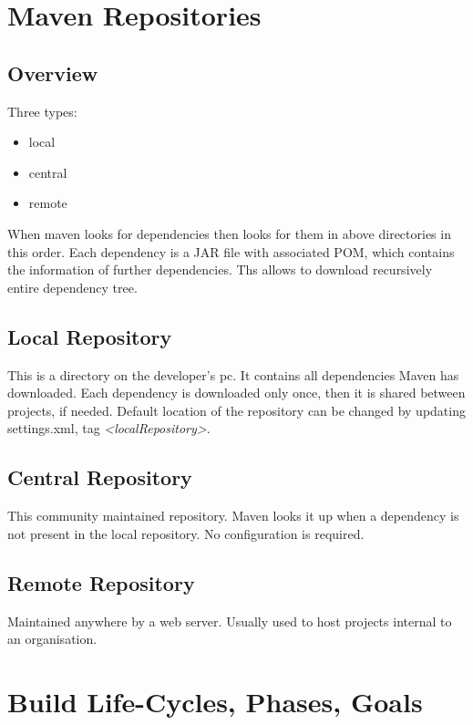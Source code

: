 \documentclass{report}
\begin{document}
\part{Maven Repositories}



\chapter{Overview}
Three types:
\begin{itemize}
	\item local
	\item central
	\item remote
\end{itemize}
When maven looks for dependencies then looks for them in above directories in this order. Each dependency is a JAR file with associated POM, which contains 
the information of further dependencies. Ths allows to download recursively entire dependency tree.

\chapter{Local Repository}
This is a directory on the developer's pc. It contains all dependencies Maven has downloaded. Each dependency is downloaded only once, then it is shared between projects, if needed. Default location of the repository can be changed by updating settings.xml, tag \textit{\textless localRepository\textgreater}.



\chapter{Central Repository}
This community maintained repository. Maven looks it up when a dependency is not present in the local repository. No configuration is required.


\chapter{Remote Repository}
Maintained anywhere by a web server. Usually used to host projects internal to an organisation.




\part{Build Life-Cycles, Phases, Goals}
\end{document}

